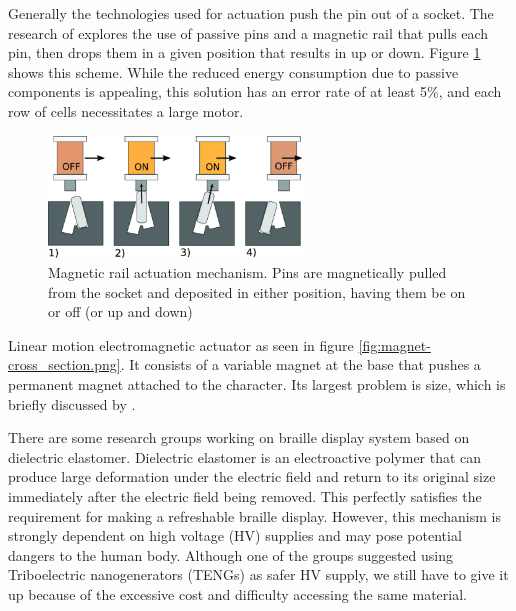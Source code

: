 Generally the technologies used for actuation push the pin out of a socket.
The research of \cite{loconsole_braillecursor_2019} explores the use of passive pins and a magnetic rail that pulls each pin, then drops them in a given position that results in up or down. Figure \ref{fig:magnetic-rail} shows this scheme.
While the reduced energy consumption due to passive components is appealing, this solution has an error rate of at least 5\%, and each row of cells necessitates a large motor.
\begin{figure}
\centering
    \includegraphics[width=0.6\textwidth]{figures/magnetic-rail.jpg}
\caption{Magnetic rail actuation mechanism. Pins are magnetically pulled from the socket and deposited in either position, having them be on or off (or up and down)}
\label{fig:magnetic-rail}
\end{figure}  

Linear motion electromagnetic actuator as seen in figure \ref{fig:magnet-cross_section.png}.
It consists of a variable magnet at the base that pushes a permanent magnet attached to the character. Its largest problem is size, which is briefly discussed by \cite{BettelaniGemmaCarolina2020DaVo}.

There are some research groups working on braille display system based on dielectric elastomer. Dielectric elastomer is an electroactive polymer that can produce large deformation under the electric field and return to its original size immediately after the electric field being removed. This perfectly satisfies the requirement for making a refreshable braille display. However, this mechanism is strongly dependent on high voltage (HV) supplies and may pose potential dangers to the human body. Although one of the groups suggested using Triboelectric nanogenerators (TENGs) as safer HV supply, we still have to give it up because of the excessive cost and difficulty accessing the same material. 

